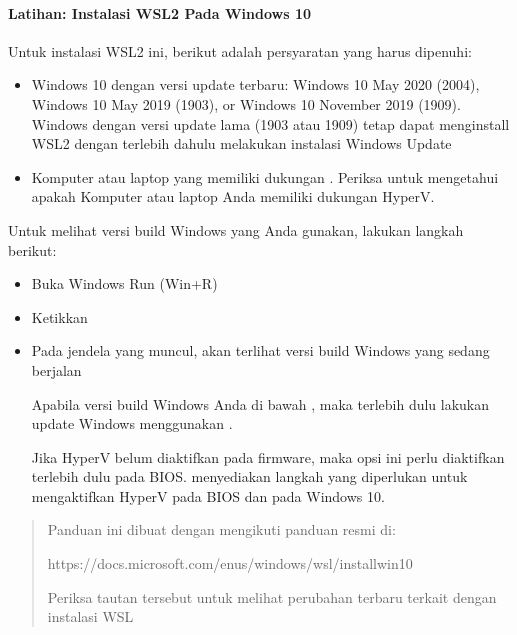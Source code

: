 \documentclass[letterpaper,10pt,english]{sphinxmanual}
\begin{document}
\paragraph{Latihan: Instalasi WSL2 Pada Windows 10}
\label{\detokenize{sesi1/pengantarlinux:latihan-instalasi-wsl2-pada-windows-10}}
Untuk instalasi WSL2 ini, berikut adalah persyaratan yang harus dipenuhi:
\begin{itemize}
\item {} 
Windows 10 dengan versi update terbaru: Windows 10 May 2020 (2004), Windows 10 May 2019 (1903), or Windows 10 November 2019 (1909). Windows dengan versi update lama (1903 atau 1909) tetap dapat menginstall WSL2 dengan terlebih dahulu melakukan instalasi Windows Update 

\item {} 
Komputer atau laptop yang memiliki dukungan . Periksa  untuk mengetahui apakah Komputer atau laptop Anda memiliki dukungan Hyper\sphinxhyphen{}V.

\end{itemize}

Untuk melihat versi build Windows yang Anda gunakan, lakukan langkah berikut:
\begin{itemize}
\item {} 
Buka Windows Run (Win+R)

\item {} 
Ketikkan 

\item {} 
Pada jendela yang muncul, akan terlihat versi build Windows yang sedang berjalan


Apabila versi build Windows Anda di bawah , maka terlebih dulu lakukan update Windows menggunakan .

Jika Hyper\sphinxhyphen{}V belum diaktifkan pada firmware, maka opsi ini perlu diaktifkan terlebih dulu pada BIOS.  menyediakan langkah yang diperlukan untuk mengaktifkan Hyper\sphinxhyphen{}V pada BIOS dan pada Windows 10.

\end{itemize}
\begin{quote}


Panduan ini dibuat dengan mengikuti panduan resmi di:

https://docs.microsoft.com/en\sphinxhyphen{}us/windows/wsl/install\sphinxhyphen{}win10

Periksa tautan tersebut untuk melihat perubahan terbaru terkait dengan instalasi WSL
\end{quote}
\end{document}
